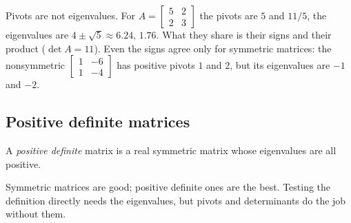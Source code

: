 \begin{trap}
Pivots are not eigenvalues. For $A=\left[\begin{smallmatrix}5&2\\2&3\end{smallmatrix}\right]$ the
pivots are $5$ and $11/5$, the eigenvalues are $4\pm\sqrt5\approx 6.24,\,1.76$. What they share is
their signs and their product ($\det A=11$). Even the signs agree only for symmetric
matrices: the nonsymmetric $\left[\begin{smallmatrix}1&-6\\1&-4\end{smallmatrix}\right]$ has
positive pivots $1$ and $2$, but its eigenvalues are $-1$ and $-2$.
\end{trap}

\subsection{Positive definite matrices}

\begin{definition}\label{def:u29-pd}
A \emph{positive definite} matrix is a real symmetric matrix whose eigenvalues are all
positive.
\end{definition}

Symmetric matrices are good; positive definite ones are the best. Testing the definition
directly needs the eigenvalues, but pivots and determinants do the job without them.

